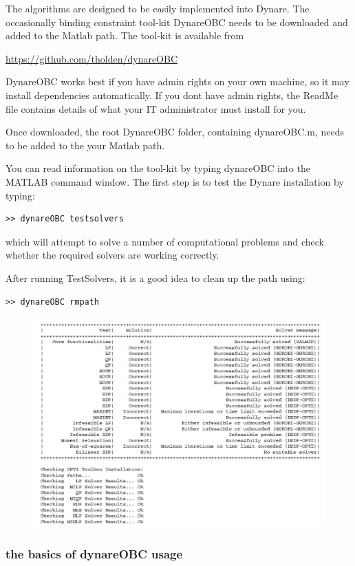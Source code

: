 \documentclass[10pt,math=newtx,citestyle=gb7714-2015,bibstyle=gb7714-2015]{elegantbook}
\begin{document}
{The algorithms are designed to be easily implemented into Dynare. The occasionally binding constraint tool-kit DynareOBC needs to be downloaded and added to the Matlab path. The tool-kit is available from

\url{https://github.com/tholden/dynareOBC}

DynareOBC works best if you have admin rights on your own machine, so it may install dependencies automatically. If you dont have admin rights, the ReadMe file contains details of what your IT administrator must install for you.

Once downloaded, the root DynareOBC folder, containing dynareOBC.m, needs to be added to the your Matlab path.

You can read information on the tool-kit by typing dynareOBC into the MATLAB command window. The first step is to test the Dynare installation by typing:

\begin{lstlisting}[frame=shadowbox]
	>> dynareOBC testsolvers
\end{lstlisting}

which will attempt to solve a number of computational problems and check whether the required solvers are working correctly.

After running TestSolvers, it is a good idea to clean up the path using:

\begin{lstlisting}[frame=shadowbox]
	>> dynareOBC rmpath
\end{lstlisting}

\begin{figure}[htbp!]
	\centering
	\includegraphics[width=0.8\linewidth]{FIG/rmpath}
	\centering
\end{figure}

\subsubsection{the basics of dynareOBC usage}

}
\end{document}
